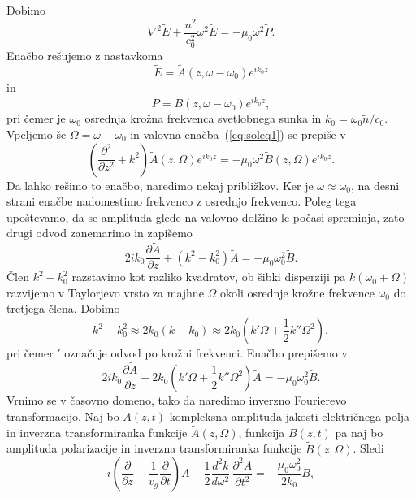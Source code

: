 Dobimo
\begin{equation}
\nabla^{2}\tilde{E}+\frac{n^2}{c_0^{2}}\omega^2 \tilde{E}=
- \mu_{0}\omega^2 \tilde{P}.
\label{eq:soleq1}
\end{equation}
Enačbo rešujemo z nastavkoma
\begin{equation}
\tilde{E} = \tilde{A} (z,\omega - \omega_0) e^{ik_0z}
\end{equation}
in 
\begin{equation}
 \tilde{P} = \tilde{B} (z,\omega - \omega_0) e^{ik_0z},
\end{equation}
pri čemer je $\omega_0$ osrednja krožna frekvenca svetlobnega sunka in $k_0 = \omega_0 \tilde{n}/c_0$. 
Vpeljemo še 
$\Omega =\omega - \omega_0$ in valovna enačba~(\ref{eq:soleq1}) se prepiše v 
\begin{equation}
\left(\frac{\partial^2}{\partial z^2}+k^2\right)\tilde{A}(z,\Omega) e^{ik_0z} =
- \mu_{0}\omega^2 \tilde{B} (z,\Omega) e^{ik_0z}.
\end{equation}
Da lahko rešimo to enačbo, naredimo nekaj približkov. Ker je $\omega \approx \omega_0$, na desni strani
enačbe nadomestimo frekvenco z osrednjo frekvenco. Poleg tega upoštevamo, da se amplituda 
glede na valovno dolžino le počasi spreminja, zato drugi odvod zanemarimo in zapišemo
\begin{equation}
2 i k_0 \frac{\partial \tilde{A}}{\partial z} + (k^2-k_0^2) \tilde{A} = - \mu_{0}\omega_0^2 \tilde{B}.
\end{equation}
Člen $k^2 - k_0^2$ razstavimo kot razliko kvadratov, ob šibki disperziji pa $k(\omega_0 + \Omega)$
razvijemo v Taylorjevo vrsto za majhne $\Omega$ 
okoli osrednje krožne frekvence $\omega_0$ do tretjega člena. Dobimo
\begin{equation}
k^2 - k_0^2 \approx 2k_0 (k-k_0) \approx 2k_0 (k'\Omega + \frac{1}{2}k''\Omega^2),
\end{equation}
pri čemer $'$ označuje odvod po krožni frekvenci. Enačbo prepišemo v 
\begin{equation}
2 i k_0 \frac{\partial \tilde{A}}{\partial z} + 2k_0(k'\Omega + \frac{1}{2}k''\Omega^2) \tilde{A} 
= - \mu_{0}\omega_0^2 \tilde{B}.
\end{equation}
Vrnimo se v časovno domeno, tako da naredimo inverzno Fourierevo transformacijo. Naj bo 
$A(z,t)$ kompleksna amplituda jakosti električnega polja in inverzna transformiranka 
funkcije $\tilde{A}(z,\Omega)$, funkcija $B(z,t)$ pa naj bo 
amplituda polarizacije in inverzna transformiranka 
funkcije $\tilde{B}(z,\Omega)$.
Sledi
\begin{equation}
i \left(\frac{\partial}{\partial z}+\frac{1}{v_{g}}\frac{\partial}{\partial t}\right)A-
\frac{1}{2}\frac{d^{2}k}{d\omega^{2}}\,\frac{\partial^{2}A}{\partial t^{2}}=
-\frac{\mu_0\omega_0^2}{2 k_0}B,
\label{8.93}
\end{equation}
